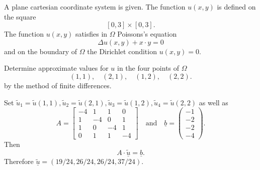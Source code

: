 A plane cartesian coordinate system is given.
The function $u(x,y)$ is defined on the square
\[
[0,3] \times [0,3].
\]
The function $u(x,y)$ satisfies in $\Omega$ Poissons's equation
\[
\Delta u(x,y) + x \cdot y = 0
\]
and on the boundary of $\Omega$ the Dirichlet condition $u(x,y) = 0.$

Determine approximate values for $u$ in the four points of $\Omega$ 
\[
(1,1), \quad  (2,1), \quad (1,2), \quad (2,2).
\]
by the method of finite differences. 

\begin{loesung}
Set
$
\tilde u_1 = \tilde u(1,1), \tilde u_2 = \tilde u(2,1),
\tilde u_3 = \tilde u(1,2), \tilde u_4 = \tilde u(2,2)
$
as well as
\[
A = \left[\begin{array}{rrrr} -4 & 1 & 1 & 0 \\ 1 & -4 & 0 & 1 \\ 1 & 0 &
  -4 & 1 \\ 0 & 1 & 1 & -4 \end{array}\right] \quad \text{and} \quad
  \underline{b} =  \left(\begin{array}{r} -1 \\ -2 \\ -2 \\ -4 \end{array}\right).
\]
Then 
\[
A \cdot \underline{\tilde u} = \underline{b}.
\]
Therefore $\underline{\tilde u} = ( 19/24, 26/24, 26/24, 37/24)$.
\end{loesung}
